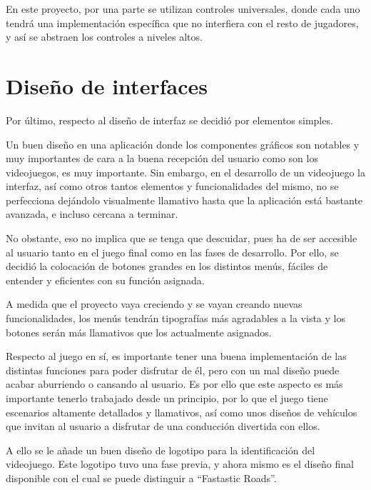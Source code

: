 En este proyecto, por una parte se utilizan controles universales, donde cada uno tendrá una implementación específica que no interfiera con el resto de jugadores, y así se abstraen los controles a niveles altos.


\section{Diseño de interfaces}

Por último, respecto al diseño de interfaz se decidió por elementos simples.

Un buen diseño en una aplicación donde los componentes gráficos son notables y muy importantes de cara a la buena recepción del usuario como son los videojuegos, es muy importante. Sin embargo, en el desarrollo de un videojuego la interfaz, así como otros tantos elementos y funcionalidades del mismo, no se perfecciona dejándolo visualmente llamativo hasta que la aplicación está bastante avanzada, e incluso cercana a terminar.

No obstante, eso no implica que se tenga que descuidar, pues ha de ser accesible al usuario tanto en el juego final como en las fases de desarrollo. Por ello, se decidió la colocación de botones grandes en los distintos menús, fáciles de entender y eficientes con su función asignada.


A medida que el proyecto vaya creciendo y se vayan creando nuevas funcionalidades, los menús tendrán tipografías más agradables a la vista y los botones serán más llamativos que los actualmente asignados.

Respecto al juego en sí, es importante tener una buena implementación de las distintas funciones para poder disfrutar de él, pero con un mal diseño puede acabar aburriendo o cansando al usuario. Es por ello que este aspecto es más importante tenerlo trabajado desde un principio, por lo que el juego tiene escenarios altamente detallados y llamativos, así como unos diseños de vehículos que invitan al usuario a disfrutar de una conducción divertida con ellos.


A ello se le añade un buen diseño de logotipo para la identificación del videojuego. Este logotipo tuvo una fase previa, y ahora mismo es el diseño final disponible con el cual se puede distinguir a ``Fastastic Roads''.

